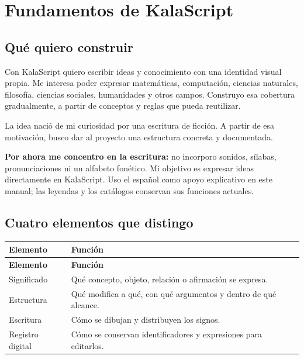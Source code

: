 \section{Fundamentos de KalaScript}

\subsection{Qué quiero construir}

Con KalaScript quiero escribir ideas y conocimiento con una identidad visual propia.
Me interesa poder expresar matemáticas, computación, ciencias naturales,
filosofía, ciencias sociales, humanidades y otros campos. Construyo esa cobertura
gradualmente, a partir de conceptos y reglas que pueda reutilizar.

La idea nació de mi curiosidad por una escritura de ficción. A partir de esa
motivación, busco dar al proyecto una estructura concreta y documentada.

\textbf{Por ahora me concentro en la escritura:} no incorporo sonidos,
sílabas, pronunciaciones ni un alfabeto fonético. Mi objetivo es expresar ideas
directamente en KalaScript. Uso el español como apoyo explicativo en este manual;
las leyendas y los catálogos conservan sus funciones actuales.

\subsection{Cuatro elementos que distingo}

\begingroup\small
\begin{longtable}{@{}>{\raggedright\arraybackslash}p{}>{\raggedright\arraybackslash}p{}@{}}
\toprule
\textbf{Elemento} & \textbf{Función} \\ \midrule
\endfirsthead
\toprule
\textbf{Elemento} & \textbf{Función} \\ \midrule
\endhead
\bottomrule\endfoot
Significado & Qué concepto, objeto, relación o afirmación se expresa. \\[4pt]
Estructura & Qué modifica a qué, con qué argumentos y dentro de qué alcance. \\[4pt]
Escritura & Cómo se dibujan y distribuyen los signos. \\[4pt]
Registro digital & Cómo se conservan identificadores y expresiones para editarlos. \\[4pt]
\end{longtable}
\endgroup

